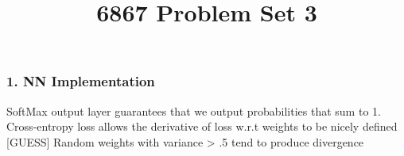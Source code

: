 \documentclass[10pt]{article}
\begin{document}
	\title{6867 Problem Set 3}
	\maketitle

    \subsubsection*{1. NN Implementation}
     SoftMax output layer guarantees that we output probabilities that sum to 1.
     Cross-entropy loss allows the derivative of loss w.r.t weights to be nicely defined [GUESS]
     Random weights with variance > .5 tend to produce divergence
\end{document}
